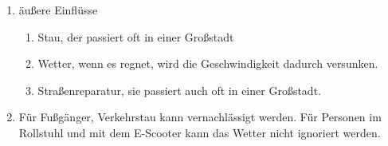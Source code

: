 \documentclass[12pt]{scrartcl}
\begin{document}
\begin{enumerate}
  \item äußere Einflüsse
  \begin{enumerate}
    \item Stau, der passiert oft in einer Großstadt
    \item Wetter, wenn es regnet, wird die Geschwindigkeit dadurch versunken.
    \item Straßenreparatur, sie passiert auch oft in einer Großstadt.
  \end{enumerate}

  \item Für Fußgänger, Verkehrstau kann vernachlässigt werden. Für Personen im Rollstuhl und mit dem E-Scooter kann das Wetter nicht ignoriert werden.
\end{enumerate}
\end{document}
